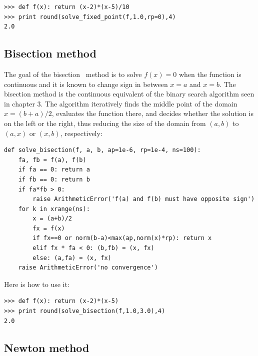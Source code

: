 \documentclass[justified,sixbynine]{tufte-book}
\def\ft{\small\tt}
\theoremstyle{plain}%
\theoremstyle{definition}
\theoremstyle{remark}
\begin{document}
\begin{fullwidth}
\begin{lstlisting}[caption={in file: {\ft nlib.py}}]
>>> def f(x): return (x-2)*(x-5)/10
>>> print round(solve_fixed_point(f,1.0,rp=0),4)
2.0
\end{lstlisting}

\goodbreak\subsection{Bisection method}


The goal of the bisection~\cite{bisection} method is to solve $f(x)=0$ when the function is continuous and it is known to change sign in between $x=a$ and $x=b$. The bisection method is the continuous equivalent of the binary search algorithm seen in chapter 3. The algorithm iteratively finds the middle point of the domain $x=(b+a)/2$, evaluates the function there, and decides whether the solution is on the left or the right, thus reducing the size of the domain from $(a,b)$ to $(a,x)$ or $(x,b)$, respectively:

\begin{lstlisting}[caption={in file: {\ft nlib.py}}]
def solve_bisection(f, a, b, ap=1e-6, rp=1e-4, ns=100):
    fa, fb = f(a), f(b)
    if fa == 0: return a
    if fb == 0: return b
    if fa*fb > 0:
        raise ArithmeticError('f(a) and f(b) must have opposite sign')
    for k in xrange(ns):
        x = (a+b)/2
        fx = f(x)
        if fx==0 or norm(b-a)<max(ap,norm(x)*rp): return x
        elif fx * fa < 0: (b,fb) = (x, fx)
        else: (a,fa) = (x, fx)
    raise ArithmeticError('no convergence')
\end{lstlisting}

Here is how to use it:

\begin{lstlisting}[caption={in file: {\ft nlib.py}}]
>>> def f(x): return (x-2)*(x-5)
>>> print round(solve_bisection(f,1.0,3.0),4)
2.0
\end{lstlisting}

\goodbreak\subsection{Newton method}



\end{fullwidth}
\end{document}
